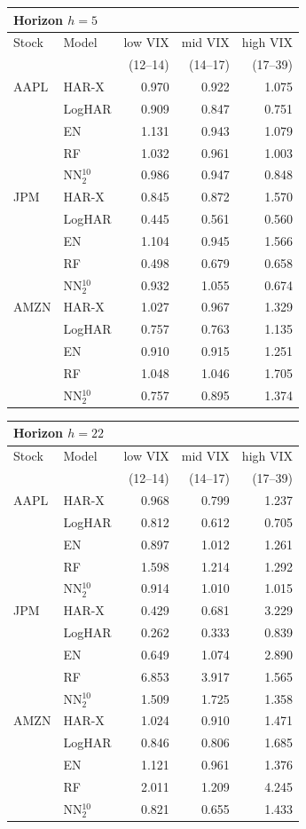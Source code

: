 \begin{tabular}{ll rrr}
\toprule
\multicolumn{5}{l}{\textbf{Horizon $h=5$}} \\
\midrule
Stock & Model & low VIX & mid VIX & high VIX \\
 & & (12--14) & (14--17) & (17--39) \\
\midrule
AAPL & HAR-X & 0.970 & 0.922 & 1.075 \\
 & LogHAR & 0.909 & 0.847 & 0.751 \\
 & EN & 1.131 & 0.943 & 1.079 \\
 & RF & 1.032 & 0.961 & 1.003 \\
 & NN$_2^{10}$ & 0.986 & 0.947 & 0.848 \\
\addlinespace
JPM & HAR-X & 0.845 & 0.872 & 1.570 \\
 & LogHAR & 0.445 & 0.561 & 0.560 \\
 & EN & 1.104 & 0.945 & 1.566 \\
 & RF & 0.498 & 0.679 & 0.658 \\
 & NN$_2^{10}$ & 0.932 & 1.055 & 0.674 \\
\addlinespace
AMZN & HAR-X & 1.027 & 0.967 & 1.329 \\
 & LogHAR & 0.757 & 0.763 & 1.135 \\
 & EN & 0.910 & 0.915 & 1.251 \\
 & RF & 1.048 & 1.046 & 1.705 \\
 & NN$_2^{10}$ & 0.757 & 0.895 & 1.374 \\
\bottomrule
\end{tabular}
\vspace{1em}

\begin{tabular}{ll rrr}
\toprule
\multicolumn{5}{l}{\textbf{Horizon $h=22$}} \\
\midrule
Stock & Model & low VIX & mid VIX & high VIX \\
 & & (12--14) & (14--17) & (17--39) \\
\midrule
AAPL & HAR-X & 0.968 & 0.799 & 1.237 \\
 & LogHAR & 0.812 & 0.612 & 0.705 \\
 & EN & 0.897 & 1.012 & 1.261 \\
 & RF & 1.598 & 1.214 & 1.292 \\
 & NN$_2^{10}$ & 0.914 & 1.010 & 1.015 \\
\addlinespace
JPM & HAR-X & 0.429 & 0.681 & 3.229 \\
 & LogHAR & 0.262 & 0.333 & 0.839 \\
 & EN & 0.649 & 1.074 & 2.890 \\
 & RF & 6.853 & 3.917 & 1.565 \\
 & NN$_2^{10}$ & 1.509 & 1.725 & 1.358 \\
\addlinespace
AMZN & HAR-X & 1.024 & 0.910 & 1.471 \\
 & LogHAR & 0.846 & 0.806 & 1.685 \\
 & EN & 1.121 & 0.961 & 1.376 \\
 & RF & 2.011 & 1.209 & 4.245 \\
 & NN$_2^{10}$ & 0.821 & 0.655 & 1.433 \\
\bottomrule
\end{tabular}
\vspace{1em}

